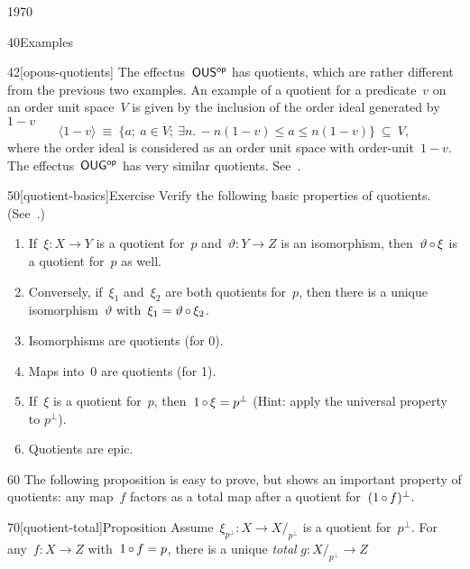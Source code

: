 \begin{parsec}{1970}
\begin{point}{40}{Examples}
\begin{point}{42}[opous-quotients]%
The effectus~${\mathsf{OUS}}{^{\mathsf{op}}}$ has quotients,
    which are rather different from the previous two examples.
An example of a  quotient for a predicate~$v$ on an order unit space~$V$
    is given by the inclusion of the order ideal generated by~$1-v$
\begin{equation*}
    \langle 1-v\rangle \ \equiv \ \{
        a; \ a\in V; \ \exists n.\, -n (1-v) \leq a \leq n (1-v) \}
    \ \subseteq\  V,
\end{equation*}
where the order ideal is considered as an order unit space
    with order-unit~$1-v$.
    The effectus~${\mathsf{OUG}}{^{\mathsf{op}}}$ has very similar quotients. See~\cite{effintro}.
\end{point}
\end{point}
\begin{point}{50}[quotient-basics]{Exercise}%
Verify the following basic properties of quotients.
    (See~\cite{effintro}.)
\begin{enumerate}
    \item If~$\xi\colon X \to Y$ is a quotient for~$p$
                and~$\vartheta\colon Y \to Z$ is an isomorphism,
                then~$\vartheta \mathop{\circ} \xi$ is a quotient for~$p$
                as well.
    \item Conversely, if~$\xi_1$ and~$\xi_2$
            are both quotients for~$p$,
            then there is a unique isomorphism~$\vartheta$
            with~$\xi_1 = \vartheta \mathop{\circ} \xi_2$.
    \item Isomorphisms are quotients (for 0).
    \item Maps into~$0$ are quotients (for 1).
    \item If~$\xi$ is a quotient for~$p$, then~$1\mathop{\circ} \xi = p^\perp$
                (Hint: apply the universal property to $p^\perp$).
    \item Quotients are epic.
\end{enumerate}
\spacingfix{}
\begin{point}{60}%
The following proposition is easy to prove,
    but shows an important property of quotients:
    any map~$f$ factors as a total map after a quotient
    for~$(1\mathop{\circ} f)^\perp$.
\end{point}
\end{point}
\begin{point}{70}[quotient-total]{Proposition}%
Assume~$\xi_{p^\perp} \colon X \to X/_{p^\perp}$ is a quotient for~$p^\perp$.
For any~$f\colon X \to Z$
    with~$1 \mathop{\circ} f = p$,
    there is a unique \emph{total} $g\colon X/_{p^\perp} \to Z$

\end{point}
\end{parsec}
